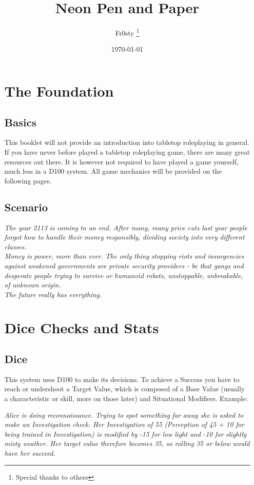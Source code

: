 \documentclass[12pt,a4paper,openany]{book}
\title{Neon Pen and Paper}
\author{Fr0sty \thanks{Special thanks to others}}
\date{\today}
\newenvironment{exampleblock}[1][1]
{\par\hfill\begin{minipage}{\dimexpr\textwidth-#1cm}}
{\end{minipage}\par}
\begin{document}
	\maketitle
	\tableofcontents
	
	\chapter{The Foundation}
	\section{Basics}
	This booklet will not provide an introduction into tabletop roleplaying in general. If you have never before played a tabletop roleplaying game, there are many great resources out there. It is however not required to have played a game yourself, much less in a D100 system. All game mechanics will be provided on the following pages.
	\section{Scenario}
	\begin{exampleblock}\textit{
		The year 2113 is coming to an end. After many, many price cuts last year people forgot how to handle their money responsibly, dividing society into \emph{very} different classes. \\
		Money is power, more than ever. The only thing stopping riots and insurgencies against weakened governments are private security providers - be that gangs and desperate people trying to survive or humanoid robots, unstoppable, unbreakable, of unknown origin. \\
		The future really has everything.
	}\end{exampleblock}
	
	\chapter{Dice Checks and Stats}
	\section{Dice}
	This system uses D100 to make its decisions. To achieve a Success you have to reach or undershoot a Target Value, which is composed of a Base Value (usually a characteristic or skill, more on those later) and Situational Modifiers. Example:
	
	\begin{exampleblock}
		\textit{Alice is doing reconnaissance. Trying to spot something far away she is asked to make an Investigation check. Her Investigation of 55 (Perception of 45 + 10 for being trained in Investigation) is modified by -15 for low light and -10 for slightly misty weather. Her target value therefore becomes 35, so rolling 35 or below would have her succeed.}
	\end{exampleblock}
\end{document}

